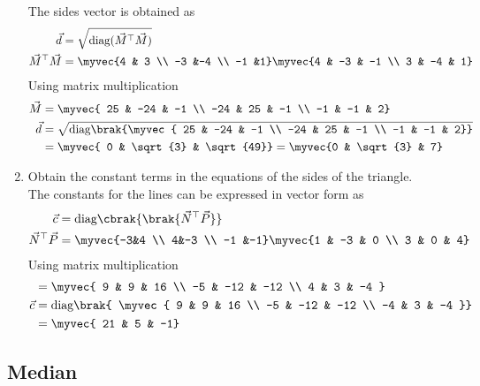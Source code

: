 \documentclass[11pt]{book}
\begin{document}
\begin{enumerate}[label=\thesubsection.\arabic*.,ref=\thesubsection.\theenumi]
\solution The sides vector is obtained as
\begin{align}
\vec{d} &= \sqrt{\text{diag}(\vec{M}^{\top}\vec{M})}\\
\vec{M}^{\top}\vec{M} &= \myvec{4 & 3 \\ -3 &-4 \\ -1 &1}\myvec{4 & -3 & -1 \\ 3 & -4 & 1}
\end{align} 
Using matrix multiplication 
\begin{align}
    \vec{M} &= \myvec{ 25 & -24 & -1 \\ -24 & 25 & -1 \\ -1 & -1 & 2} \\
    \vec{d} &= \sqrt{\text{diag}\brak{\myvec{ 25 & -24 & -1 \\ -24 & 25 & -1 \\ -1 & -1 & 2}}} \\
    &= \myvec{ 0 & \sqrt{3} & \sqrt{49}} = \myvec{0 & \sqrt{3} & 7}
\end{align}

\item Obtain the constant terms in the equations of the sides of the triangle. \\
\solution The constants for the lines can be expressed in vector form as
\begin{align}
\vec{c} &= \text{diag}\cbrak{\brak{\vec{N}^{\top}\vec{P}}}  \\
\vec{N}^{\top}\vec{P} &= \myvec{-3&4 \\ 4&-3 \\ -1 &-1}\myvec{1 & -3 & 0 \\ 3 & 0 & 4} \\
\end{align}
Using matrix multiplication
\begin{align}
    &=\myvec{ 9 & 9 & 16 \\ -5 & -12 & -12 \\ 4 & 3 & -4 } \\
    \vec{c} &= \text{diag}\brak{ \myvec{ 9 & 9 & 16 \\ -5 & -12 & -12 \\ -4 & 3 & -4 }} \\
    &= \myvec{ 21 & 5 & -1}
\end{align}
\end{enumerate}


\subsection{Median}
\end{document}
